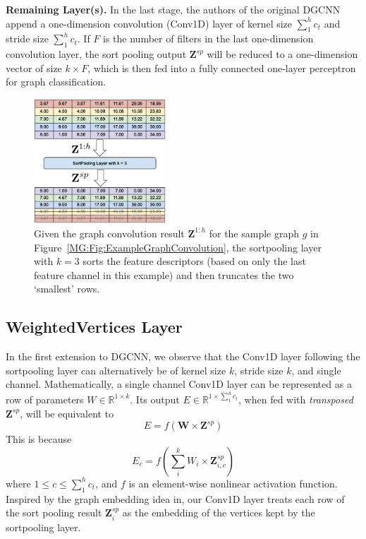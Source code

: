 \textbf{Remaining Layer(s).} In the last stage, the authors of the original DGCNN\cite{Dgcnn} append a one-dimension convolution (Conv1D) layer of kernel size $\sum_{1}^{h}c_t$ and stride size $\sum_{1}^{h}c_t$.
If $F$ is the number of filters in the last one-dimension convolution layer, the sort pooling output $\mathbf{Z}^{sp}$ will be reduced to a one-dimension vector of size $k \times F$, which is then fed into a fully connected one-layer perceptron for graph classification.

\begin{figure}[htbp]
\centerline{\includegraphics[width=0.44\textwidth]{Magic/figures/ExampleSortpool.eps}}
\caption{Given the graph convolution result $\mathbf{Z}^{1:h}$ for the sample graph $g$ in Figure~\ref{MG:Fig:ExampleGraphConvolution}, the sortpooling layer with $k = 3$ sorts the feature descriptors (based on only the last feature channel in this example) and then truncates the two `smallest' rows.}
\label{MG:Fig:ExampleSortpool}
\end{figure}

\subsection{WeightedVertices Layer}
In the first extension to DGCNN, we observe that the Conv1D layer following the sortpooling layer can alternatively be of kernel size $k$, stride size $k$, and single channel.
Mathematically, a single channel Conv1D layer can be represented as a row of parameters $W \in \mathbb{R}^{1 \times k}$.
Its output $E \in \mathbb{R}^{1 \times \sum_{1}^{h}c_t}$, when fed with \textit{transposed} $\mathbf{Z}^{sp}$, will be equivalent to
\begin{equation}
    E = f(\mathbf{W} \times \mathbf{Z}^{sp})
\label{MG:Equ:WeightedVertices}
\end{equation}
This is because
\begin{equation}
    E_c = f(\sum_{i}^{k} W_i \times \mathbf{Z}^{sp}_{i, c})
\end{equation}
where $1\leq c \leq \sum_{1}^{h}c_t$, and $f$ is an element-wise nonlinear activation function.
Inspired by the graph embedding idea in\cite{GraphEmbedding}, our Conv1D layer treats each row of the sort pooling result $\mathbf{Z}^{sp}_{i}$ as the embedding of the vertices kept by the sortpooling layer.

